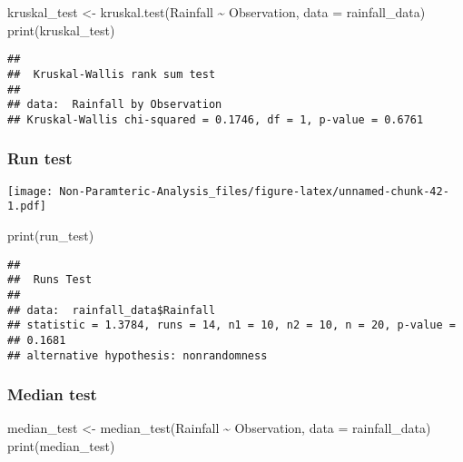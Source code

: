 \documentclass[
]{article}
\newenvironment{Shaded}{\begin{snugshade}}{\end{snugshade}}
\newcommand{\AttributeTok}[1]{\textcolor[rgb]{0.77,0.63,0.00}{#1}}
\newcommand{\ConstantTok}[1]{\textcolor[rgb]{0.00,0.00,0.00}{#1}}
\newcommand{\FunctionTok}[1]{\textcolor[rgb]{0.00,0.00,0.00}{#1}}
\newcommand{\NormalTok}[1]{#1}
\newcommand{\OtherTok}[1]{\textcolor[rgb]{0.56,0.35,0.01}{#1}}
\newcommand{\SpecialCharTok}[1]{\textcolor[rgb]{0.00,0.00,0.00}{#1}}
\begin{document}
\begin{Shaded}
\begin{Highlighting}[]
\NormalTok{kruskal\_test }\OtherTok{\textless{}{-}} \FunctionTok{kruskal.test}\NormalTok{(Rainfall }\SpecialCharTok{\textasciitilde{}}\NormalTok{ Observation, }\AttributeTok{data =}\NormalTok{ rainfall\_data)}
\FunctionTok{print}\NormalTok{(kruskal\_test)}
\end{Highlighting}
\end{Shaded}

\begin{verbatim}
## 
##  Kruskal-Wallis rank sum test
## 
## data:  Rainfall by Observation
## Kruskal-Wallis chi-squared = 0.1746, df = 1, p-value = 0.6761
\end{verbatim}

\hypertarget{run-test}{%
\subsubsection{Run test}\label{run-test}}

\begin{Shaded}
\end{Shaded}

\texttt{[image: Non-Paramteric-Analysis\_files/figure-latex/unnamed-chunk-42-1.pdf]}

\begin{Shaded}
\begin{Highlighting}[]
\FunctionTok{print}\NormalTok{(run\_test)}
\end{Highlighting}
\end{Shaded}

\begin{verbatim}
## 
##  Runs Test
## 
## data:  rainfall_data$Rainfall
## statistic = 1.3784, runs = 14, n1 = 10, n2 = 10, n = 20, p-value =
## 0.1681
## alternative hypothesis: nonrandomness
\end{verbatim}

\hypertarget{median-test}{%
\subsubsection{Median test}\label{median-test}}

\begin{Shaded}
\begin{Highlighting}[]
\NormalTok{median\_test }\OtherTok{\textless{}{-}} \FunctionTok{median\_test}\NormalTok{(Rainfall }\SpecialCharTok{\textasciitilde{}}\NormalTok{ Observation, }\AttributeTok{data =}\NormalTok{ rainfall\_data)}
\FunctionTok{print}\NormalTok{(median\_test)}
\end{Highlighting}
\end{Shaded}
\end{document}
